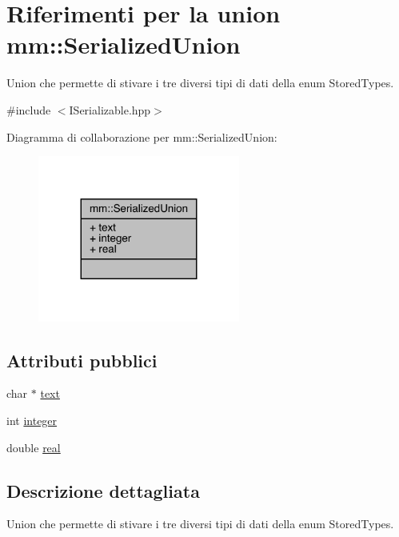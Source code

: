 \hypertarget{unionmm_1_1_serialized_union}{}\section{Riferimenti per la union mm\+:\+:Serialized\+Union}
\label{unionmm_1_1_serialized_union}


Union che permette di stivare i tre diversi tipi di dati della enum Stored\+Types.  




{\ttfamily \#include $<$I\+Serializable.\+hpp$>$}



Diagramma di collaborazione per mm\+:\+:Serialized\+Union\+:\nopagebreak
\begin{figure}[H]
\begin{center}
\leavevmode
\includegraphics[width=188pt]{d5/d2a/unionmm_1_1_serialized_union__coll__graph}
\end{center}
\end{figure}
\subsection*{Attributi pubblici}
\begin{DoxyCompactItemize}
\item 
char $\ast$ \hyperlink{unionmm_1_1_serialized_union_a8d0497571c8ac717f7f49226477f13bf}{text}
\item 
int \hyperlink{unionmm_1_1_serialized_union_ab1b4916d7e61e14280d62aecf668d402}{integer}
\item 
double \hyperlink{unionmm_1_1_serialized_union_a315b1f30581d381d4ce1bb980641a200}{real}
\end{DoxyCompactItemize}


\subsection{Descrizione dettagliata}
Union che permette di stivare i tre diversi tipi di dati della enum Stored\+Types. 

